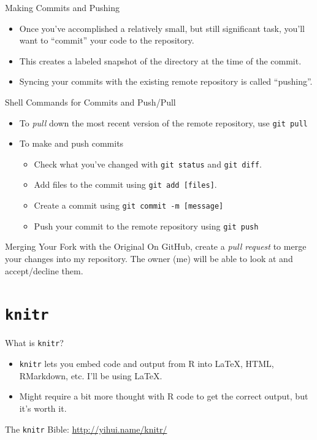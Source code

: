 \documentclass{beamer}\usepackage[]{graphicx}\usepackage[]{color}
\begin{document}
	\begin{frame}{Making Commits and Pushing}
		\begin{itemize}
			\item Once you've accomplished a relatively small, but still significant task, you'll want to ``commit'' your code to the repository.
			\item This creates a labeled snapshot of the directory at the time of the commit.
			\item Syncing your commits with the existing remote repository is called ``pushing''.
		\end{itemize}
	\end{frame}
	
	\begin{frame}{Shell Commands for Commits and Push/Pull}
		\begin{itemize}
			\item To \textit{pull} down the most recent version of the remote repository, use \texttt{git pull}
			\item To make and push commits
			\begin{itemize}
				\item Check what you've changed with \texttt{git status} and \texttt{git diff}.
				\item Add files to the commit using \texttt{git add [files]}.
				\item Create a commit using \texttt{git commit -m [message]}
				\item Push your commit to the remote repository using \texttt{git push}
			\end{itemize}
		\end{itemize}
	\end{frame}
	
	\begin{frame}{Merging Your Fork with the Original}
		On GitHub, create a \textit{pull request} to merge your changes into my repository. The owner (me) will be able to look at and accept/decline them.
	\end{frame}
	
	\section{\texttt{knitr}}
	
	\begin{frame}{What is \texttt{knitr}?}
		\begin{itemize}
			\item \texttt{knitr} lets you embed code and output from R into \LaTeX, HTML, RMarkdown, etc. I'll be using \LaTeX.
			\item Might require a bit more thought with R code to get the correct output, but it's worth it.
		\end{itemize}
		The \texttt{knitr} Bible: \url{http://yihui.name/knitr/}
	\end{frame}
	
\end{document}

